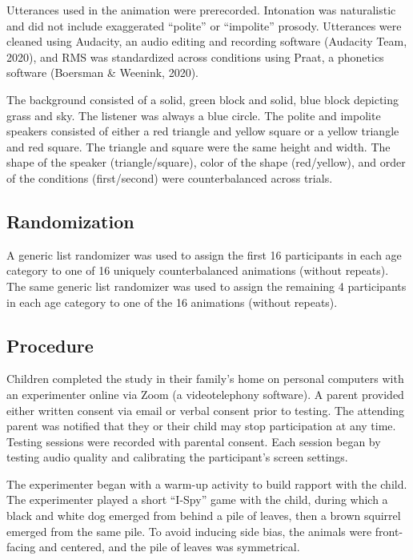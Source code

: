 \documentclass[
  english,
  man,floatsintext]{apa6}
\begin{document}
Utterances used in the animation were prerecorded. Intonation was naturalistic and did not include exaggerated ``polite'' or ``impolite'' prosody. Utterances were cleaned using Audacity, an audio editing and recording software (Audacity Team, 2020), and RMS was standardized across conditions using Praat, a phonetics software (Boersman \& Weenink, 2020).

The background consisted of a solid, green block and solid, blue block depicting grass and sky. The listener was always a blue circle. The polite and impolite speakers consisted of either a red triangle and yellow square or a yellow triangle and red square. The triangle and square were the same height and width. The shape of the speaker (triangle/square), color of the shape (red/yellow), and order of the conditions (first/second) were counterbalanced across trials.

\hypertarget{randomization}{%
\subsection{Randomization}\label{randomization}}

A generic list randomizer was used to assign the first 16 participants in each age category to one of 16 uniquely counterbalanced animations (without repeats). The same generic list randomizer was used to assign the remaining 4 participants in each age category to one of the 16 animations (without repeats).

\hypertarget{procedure}{%
\subsection{Procedure}\label{procedure}}

Children completed the study in their family's home on personal computers with an experimenter online via Zoom (a videotelephony software). A parent provided either written consent via email or verbal consent prior to testing. The attending parent was notified that they or their child may stop participation at any time. Testing sessions were recorded with parental consent. Each session began by testing audio quality and calibrating the participant's screen settings.

The experimenter began with a warm-up activity to build rapport with the child. The experimenter played a short ``I-Spy'' game with the child, during which a black and white dog emerged from behind a pile of leaves, then a brown squirrel emerged from the same pile. To avoid inducing side bias, the animals were front-facing and centered, and the pile of leaves was symmetrical.
\end{document}
